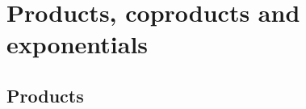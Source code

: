 
\section{Products, coproducts and exponentials}
\label{sec:prod-copr-expon}

\subsection{Products}
\label{sec:products}

